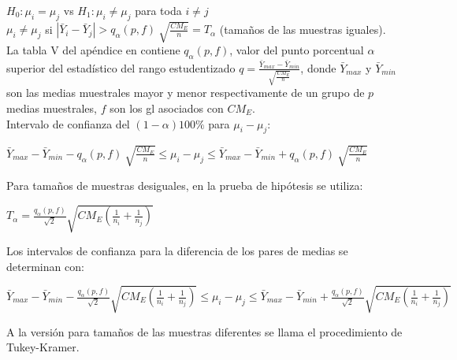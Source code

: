 $H_{0}:\mu_{i} = \mu_{j}$ vs $H_{1}:\mu_{i} \neq \mu_{j}$ para toda $i \neq j$\\

 $\mu_{i} \neq \mu_{j}$ si $| \bar{Y}_{i} -\bar{Y}_{j} | > q_{\alpha} (p,f) \: \sqrt{\frac{CM_{E}}{n}} = T_{\alpha}$ (tamaños de las muestras iguales).\\
 

La tabla V del apéndice en \textcite{montgomery-2017} contiene $q_{\alpha} (p,f)$, valor del punto porcentual $\alpha$ superior del estadístico del rango estudentizado $q=\frac{ \bar{Y}_{max} -\bar{Y}_{min}}{ \sqrt{\frac{CM_{E}}{n}}}$, donde $\bar{Y}_{max}$ y $\bar{Y}_{min}$ son las medias muestrales mayor y menor respectivamente de un grupo de $p$ medias muestrales, $f$ son los gl asociados con $CM_{E}$.\\
 
Intervalo de confianza del  $(1-\alpha)100\%$ para $\mu_{i} - \mu_{j}$:\\
 
\begin{center}
	$ \bar{Y}_{max} -\bar{Y}_{min} -  q_{\alpha} (p,f) \: \sqrt{\frac{CM_{E}}{n}} \leq \mu_{i} - \mu_{j} \leq \bar{Y}_{max} -\bar{Y}_{min} + q_{\alpha} (p,f) \: \sqrt{\frac{CM_{E}}{n}} $ \\
\end{center}

Para tamaños de muestras desiguales, en la prueba de hipótesis se utiliza:\\

\begin{center}
	$ T_{\alpha} = \frac{q_{\alpha} (p,f)}{\sqrt{2}} \sqrt{CM_{E} (\frac{1}{n_{i}} + \frac{1}{n_{j}})}  $ \\
\end{center}


Los intervalos de confianza para la diferencia de los pares de medias se determinan con:\\


\begin{center}
	$ \bar{Y}_{max} -\bar{Y}_{min} -  \frac{q_{\alpha} (p,f)}{\sqrt{2}} \sqrt{CM_{E} (\frac{1}{n_{i}} + \frac{1}{n_{j}})}  \leq \mu_{i} - \mu_{j} \leq \bar{Y}_{max} -\bar{Y}_{min} + \frac{q_{\alpha} (p,f)}{\sqrt{2}} \sqrt{CM_{E} (\frac{1}{n_{i}} + \frac{1}{n_{j}})}  $ \\
\end{center}

A la versión para tamaños de las muestras diferentes se llama el procedimiento de Tukey-Kramer.

